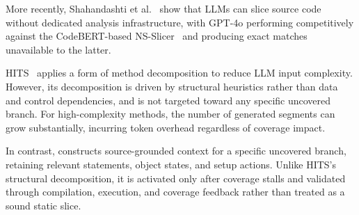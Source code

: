 More recently, Shahandashti et al.~\cite{shahandashti2024programslicingeralarge} show that LLMs can slice source code without dedicated analysis infrastructure, with GPT-4o performing competitively against the CodeBERT-based NS-Slicer~\cite{feng2020codebert} and producing exact matches unavailable to the latter.

HITS~\cite{wang2024c} applies a form of method decomposition to reduce LLM input complexity. However, its decomposition is driven by structural heuristics rather than data and control dependencies, and is not targeted toward any specific uncovered branch. For high-complexity methods, the number of generated segments can grow substantially, incurring token overhead regardless of coverage impact.

In contrast, \ourmethod{} constructs source-grounded context for a specific uncovered branch, retaining relevant statements, object states, and setup actions. Unlike HITS's structural decomposition, it is activated only after coverage stalls and validated through compilation, execution, and coverage feedback rather than treated as a sound static slice.
